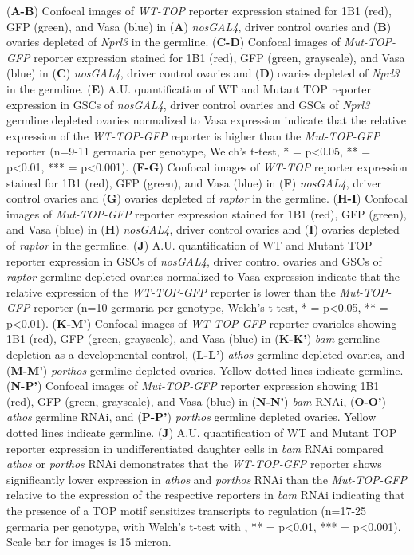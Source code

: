 \documentclass[12pt,oneside]{reedthesis}
\begin{document}
(\textbf{A-B}) Confocal images of \emph{WT-TOP}
reporter expression stained for 1B1 (red), GFP (green), and Vasa (blue)
in (\textbf{A}) \emph{nosGAL4}, driver control ovaries and (\textbf{B}) ovaries
depleted of \emph{Nprl3} in the germline. (\textbf{C-D}) Confocal images of
\emph{Mut-TOP-GFP} reporter expression stained for 1B1 (red), GFP (green,
grayscale), and Vasa (blue) in (\textbf{C}) \emph{nosGAL4}, driver control ovaries
and (\textbf{D}) ovaries depleted of \emph{Nprl3} in the germline. (\textbf{E}) A.U.
quantification of WT and Mutant TOP reporter expression in GSCs of
\emph{nosGAL4}, driver control ovaries and GSCs of \emph{Nprl3} germline depleted
ovaries normalized to Vasa expression indicate that the relative
expression of the \emph{WT-TOP-GFP} reporter is higher than the \emph{Mut-TOP-GFP}
reporter (n=9-11 germaria per genotype, Welch's t-test, * = p\textless0.05,
** = p\textless0.01, *** = p\textless0.001). (\textbf{F-G}) Confocal images of
\emph{WT-TOP} reporter expression stained for 1B1 (red), GFP (green), and
Vasa (blue) in (\textbf{F}) \emph{nosGAL4}, driver control ovaries and (\textbf{G})
ovaries depleted of \emph{raptor} in the germline. (\textbf{H-I}) Confocal images
of \emph{Mut-TOP-GFP} reporter expression stained for 1B1 (red), GFP (green),
and Vasa (blue) in (\textbf{H}) \emph{nosGAL4}, driver control ovaries and (\textbf{I})
ovaries depleted of \emph{raptor} in the germline. (\textbf{J}) A.U.
quantification of WT and Mutant TOP reporter expression in GSCs of
\emph{nosGAL4}, driver control ovaries and GSCs of \emph{raptor} germline depleted
ovaries normalized to Vasa expression indicate that the relative
expression of the \emph{WT-TOP-GFP} reporter is lower than the \emph{Mut-TOP-GFP}
reporter (n=10 germaria per genotype, Welch's t-test, * = p\textless0.05, **
= p\textless0.01). (\textbf{K-M'}) Confocal images of \emph{WT-TOP-GFP} reporter
ovarioles showing 1B1 (red), GFP (green, grayscale), and Vasa (blue) in
(\textbf{K-K'}) \emph{bam} germline depletion as a developmental control,
(\textbf{L-L'}) \emph{athos} germline depleted ovaries, and (\textbf{M-M'}) \emph{porthos}
germline depleted ovaries. Yellow dotted lines indicate germline.
(\textbf{N-P'}) Confocal images of \emph{Mut-TOP-GFP} reporter expression showing
1B1 (red), GFP (green, grayscale), and Vasa (blue) in (\textbf{N-N'}) \emph{bam}
RNAi, (\textbf{O-O'}) \emph{athos} germline RNAi, and (\textbf{P-P'}) \emph{porthos}
germline depleted ovaries. Yellow dotted lines indicate germline.
(\textbf{J}) A.U. quantification of WT and Mutant TOP reporter expression in
undifferentiated daughter cells in \emph{bam} RNAi compared \emph{athos} or
\emph{porthos} RNAi demonstrates that the \emph{WT-TOP-GFP} reporter shows
significantly lower expression in \emph{athos} and \emph{porthos} RNAi than the
\emph{Mut-TOP-GFP} relative to the expression of the respective reporters in
\emph{bam} RNAi indicating that the presence of a TOP motif sensitizes
transcripts to regulation (n=17-25 germaria per genotype, with Welch's
t-test with , ** = p\textless0.01, *** = p\textless0.001). Scale bar for images
is 15 micron.
\end{document}
